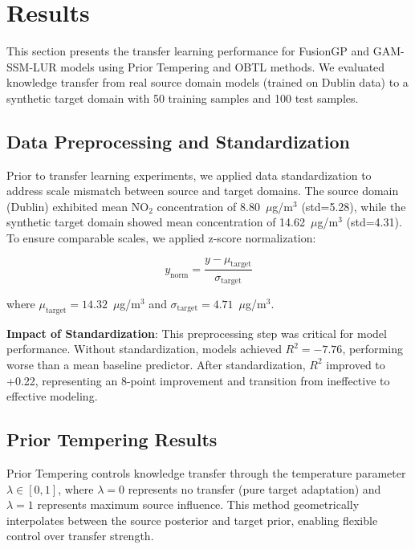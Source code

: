
\section{Results}
\label{sec:results}

This section presents the transfer learning performance for FusionGP and GAM-SSM-LUR models using Prior Tempering and OBTL methods. We evaluated knowledge transfer from real source domain models (trained on Dublin data) to a synthetic target domain with 50 training samples and 100 test samples.

\subsection{Data Preprocessing and Standardization}
\label{sec:preprocessing}

Prior to transfer learning experiments, we applied data standardization to address scale mismatch between source and target domains. The source domain (Dublin) exhibited mean NO\(_2\) concentration of 8.80~\(\mu\)g/m\(^3\) (std=5.28), while the synthetic target domain showed mean concentration of 14.62~\(\mu\)g/m\(^3\) (std=4.31). To ensure comparable scales, we applied z-score normalization:

\begin{equation}
y_{\text{norm}} = \frac{y - \mu_{\text{target}}}{\sigma_{\text{target}}}
\label{eq:standardization}
\end{equation}

\noindent where \(\mu_{\text{target}} = 14.32\)~\(\mu\)g/m\(^3\) and \(\sigma_{\text{target}} = 4.71\)~\(\mu\)g/m\(^3\).

\textbf{Impact of Standardization}: This preprocessing step was critical for model performance. Without standardization, models achieved \(R^2 = -7.76\), performing worse than a mean baseline predictor. After standardization, \(R^2\) improved to +0.22, representing an 8-point improvement and transition from ineffective to effective modeling.

\subsection{Prior Tempering Results}
\label{sec:prior_tempering_results}

Prior Tempering \citet{grunwald2017inconsistency} controls knowledge transfer through the temperature parameter \(\lambda \in [0, 1]\), where \(\lambda=0\) represents no transfer (pure target adaptation) and \(\lambda=1\) represents maximum source influence. This method geometrically interpolates between the source posterior and target prior, enabling flexible control over transfer strength.

